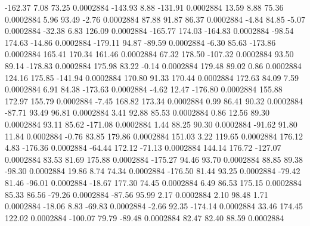      -162.37        7.08       73.25     0.0002884
     -143.93        8.88     -131.91     0.0002884
       13.59        8.88       75.36     0.0002884
        5.96       93.49       -2.76     0.0002884
       87.88       91.87       86.37     0.0002884
       -4.84       84.85       -5.07     0.0002884
      -32.38        6.83      126.09     0.0002884
     -165.77      174.03     -164.83     0.0002884
      -98.54      174.63      -14.86     0.0002884
     -179.11       94.87      -89.59     0.0002884
       -6.30       85.63     -173.86     0.0002884
      165.41      170.34      161.46     0.0002884
       67.32      178.50     -107.32     0.0002884
       93.50       89.14     -178.83     0.0002884
      175.98       83.22       -0.14     0.0002884
      179.48       89.02        0.86     0.0002884
      124.16      175.85     -141.94     0.0002884
      170.80       91.33      170.44     0.0002884
      172.63       84.09        7.59     0.0002884
        6.91       84.38     -173.63     0.0002884
       -4.62       12.47     -176.80     0.0002884
      155.88      172.97      155.79     0.0002884
       -7.45      168.82      173.34     0.0002884
        0.99       86.41       90.32     0.0002884
      -87.71       93.49       96.81     0.0002884
        3.41       92.88       85.53     0.0002884
        0.86       12.56       89.30     0.0002884
       93.11       85.62     -171.08     0.0002884
        1.44       88.25       90.30     0.0002884
      -91.62       91.80       11.84     0.0002884
       -0.76       83.85      179.86     0.0002884
      151.03        3.22      119.65     0.0002884
      176.12        4.83     -176.36     0.0002884
      -64.44      172.12      -71.13     0.0002884
      144.14      176.72     -127.07     0.0002884
       83.53       81.69      175.88     0.0002884
     -175.27       94.46       93.70     0.0002884
       88.85       89.38      -98.30     0.0002884
       19.86        8.74       74.34     0.0002884
     -176.50       81.44       93.25     0.0002884
      -79.42       81.46      -96.01     0.0002884
      -18.67      177.30       74.45     0.0002884
        6.49       86.53      175.15     0.0002884
       85.33       86.56      -79.26     0.0002884
      -87.56       95.99        2.17     0.0002884
        2.10       98.48        1.71     0.0002884
      -18.06        8.83      -69.83     0.0002884
       -2.66       92.35     -174.14     0.0002884
       33.46      174.45      122.02     0.0002884
     -100.07       79.79      -89.48     0.0002884
       82.47       82.40       88.59     0.0002884
